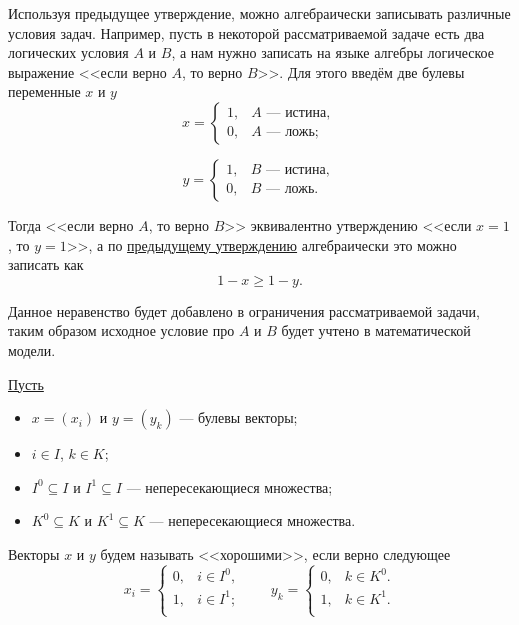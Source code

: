 \example

Используя предыдущее утверждение, можно алгебраически записывать различные условия задач. Например, пусть в некоторой рассматриваемой задаче есть два логических условия $A$ и $B$, а нам нужно записать на языке алгебры логическое выражение <<если верно $A$, то верно $B$>>. Для этого введём две булевы переменные $x$ и $y$
\[
x = \begin{cases}
	1, & \text{$A$ --- истина}, \\
	0, & \text{$A$ --- ложь};
\end{cases}
\]

\[
y = \begin{cases}
	1, & \text{$B$ --- истина}, \\
	0, & \text{$B$ --- ложь}.
\end{cases}
\]

Тогда <<если верно $A$, то верно $B$>> эквивалентно утверждению <<если $x = 1$, то $y = 1$>>, а по \hyperref[fact:simple_conditions]{предыдущему утверждению} алгебраически это можно записать как
\[
\boxed{1 - x \ge 1 - y}.
\]

Данное неравенство будет добавлено в ограничения рассматриваемой задачи, таким образом исходное условие про $A$ и $B$ будет учтено в математической модели.

\label{fact:complex_conditions}

\underline{Пусть}
\begin{itemize}[nosep]	
	\item $x = (x_i)$ и $y = (y_k)$ --- булевы векторы;
	
	\item $i \in I$, $k \in K$;
	
	\item $I^0 \subseteq I$ и $I^1 \subseteq I$ --- непересекающиеся множества;
	
	\item $K^0 \subseteq K$ и $K^1 \subseteq K$ --- непересекающиеся множества.
\end{itemize}

Векторы $x$ и $y$ будем называть <<хорошими>>, если верно следующее
\[
x_i = \begin{cases}
	0,& i \in I^0,\\
	1,& i \in I^1;\\
\end{cases} \qquad y_k = \begin{cases}
0,& k \in K^0.\\
1,& k \in K^1.\\
\end{cases}
\]

